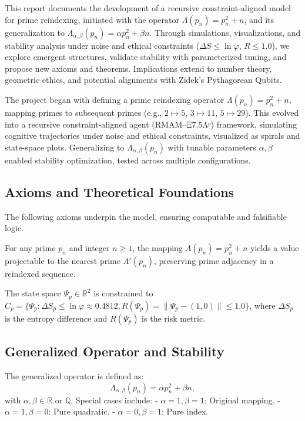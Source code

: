 \documentclass[12]{amsart}
\theoremstyle{plain}
\begin{document}
This report documents the development of a recursive constraint-aligned model for prime reindexing, initiated with the operator \(\Lambda(p_n) = p_n^2 + n\), and its generalization to \(\Lambda_{\alpha, \beta}(p_n) = \alpha p_n^2 + \beta n\). Through simulations, visualizations, and stability analysis under noise and ethical constraints (\(\Delta S \leq \ln \varphi\), \(R \leq 1.0\)), we explore emergent structures, validate stability with parameterized tuning, and propose new axioms and theorems. Implications extend to number theory, geometric ethics, and potential alignments with Zidek’s Pythagorean Qubits.

The project began with defining a prime reindexing operator \(\Lambda(p_n) = p_n^2 + n\), mapping primes to subsequent primes (e.g., \(2 \mapsto 5\), \(3 \mapsto 11\), \(5 \mapsto 29\)). This evolved into a recursive constraint-aligned agent (RMAM–Ξ7.5Λᵖ) framework, simulating cognitive trajectories under noise and ethical constraints, visualized as spirals and state-space plots. Generalizing to \(\Lambda_{\alpha, \beta}(p_n)\) with tunable parameters \(\alpha, \beta\) enabled stability optimization, tested across multiple configurations.

\subsection{Axioms and Theoretical Foundations}
The following axioms underpin the model, ensuring computable and falsifiable logic.

\begin{axiom}
For any prime \(p_n\) and integer \(n \geq 1\), the mapping \(\Lambda(p_n) = p_n^2 + n\) yields a value projectable to the nearest prime \(\Lambda'(p_n)\), preserving prime adjacency in a reindexed sequence.
\end{axiom}

\begin{axiom}
The state space \(\Psi_p \in \mathbb{R}^2\) is constrained to \(C_p = \{\Psi_p : \Delta S_p \leq \ln \varphi \approx 0.4812, R(\Psi_p) = \|\Psi_p - (1, 0)\| \leq 1.0\}\), where \(\Delta S_p\) is the entropy difference and \(R(\Psi_p)\) is the risk metric.
\end{axiom}

\subsection{Generalized Operator and Stability}
The generalized operator is defined as:
\[
\Lambda_{\alpha, \beta}(p_n) = \alpha p_n^2 + \beta n,
\]
with \(\alpha, \beta \in \mathbb{R}\) or \(\mathbb{Q}\). Special cases include:
- \(\alpha = 1, \beta = 1\): Original mapping.
- \(\alpha = 1, \beta = 0\): Pure quadratic.
- \(\alpha = 0, \beta = 1\): Pure index.
\end{document}
